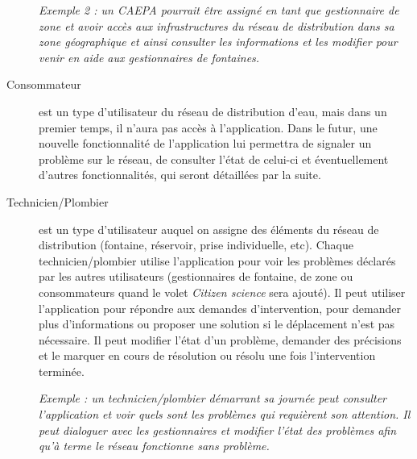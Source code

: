 \documentclass[a4paper, 11pt]{article}
\begin{document}
\begin{description}
    \emph{Exemple 2 : un CAEPA pourrait être assigné en tant que gestionnaire de zone et avoir accès aux infrastructures du réseau de distribution dans sa zone géographique et ainsi consulter les informations et les modifier pour venir en aide aux gestionnaires de fontaines.}

    \item[Consommateur] est un type d'utilisateur du réseau de distribution d'eau, mais dans un premier temps, il n'aura pas accès à l'application. Dans le futur, une nouvelle fonctionnalité de l'application lui permettra de signaler un problème sur le réseau, de consulter l'état de celui-ci et éventuellement d'autres fonctionnalités, qui seront détaillées par la suite.

    \item[Technicien/Plombier] est un type d'utilisateur auquel on assigne des éléments du réseau de distribution (fontaine, réservoir, prise individuelle, etc). Chaque technicien/plombier utilise l'application pour voir les problèmes déclarés par les autres utilisateurs (gestionnaires de fontaine, de zone ou consommateurs quand le volet \emph{Citizen science} sera ajouté). Il peut utiliser l'application pour répondre aux demandes d'intervention, pour demander plus d'informations ou proposer une solution si le déplacement n'est pas nécessaire. Il peut modifier l'état d'un problème, demander des précisions et le marquer en cours de résolution ou résolu une fois l'intervention terminée.

    \emph{Exemple : un technicien/plombier démarrant sa journée peut consulter l'application et voir quels sont les problèmes qui requièrent son attention. Il peut dialoguer avec les gestionnaires et modifier l'état des problèmes afin qu'à terme le réseau fonctionne sans problème.}

  \end{description}
\end{document}
